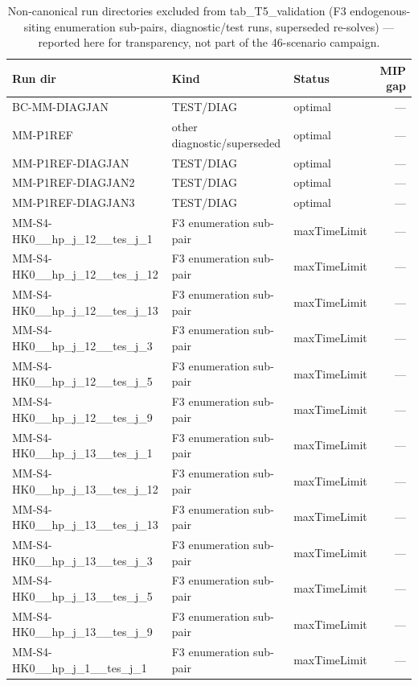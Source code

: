 \begin{table}[htbp]
  \centering
  \caption{Non-canonical run directories excluded from tab\_T5\_validation (F3 endogenous-siting enumeration sub-pairs, diagnostic/test runs, superseded re-solves) — reported here for transparency, not part of the 46-scenario campaign.}
  \label{tab:t5_supplement_excluded}
  \begin{tabular}{lllr}
  \toprule
  Run dir & Kind & Status & MIP gap \\
  \midrule
  BC-MM-DIAGJAN & TEST/DIAG & optimal & — \\
  MM-P1REF & other diagnostic/superseded & optimal & — \\
  MM-P1REF-DIAGJAN & TEST/DIAG & optimal & — \\
  MM-P1REF-DIAGJAN2 & TEST/DIAG & optimal & — \\
  MM-P1REF-DIAGJAN3 & TEST/DIAG & optimal & — \\
  MM-S4-HK0\_\_hp\_j\_12\_\_tes\_j\_1 & F3 enumeration sub-pair & maxTimeLimit & — \\
  MM-S4-HK0\_\_hp\_j\_12\_\_tes\_j\_12 & F3 enumeration sub-pair & maxTimeLimit & — \\
  MM-S4-HK0\_\_hp\_j\_12\_\_tes\_j\_13 & F3 enumeration sub-pair & maxTimeLimit & — \\
  MM-S4-HK0\_\_hp\_j\_12\_\_tes\_j\_3 & F3 enumeration sub-pair & maxTimeLimit & — \\
  MM-S4-HK0\_\_hp\_j\_12\_\_tes\_j\_5 & F3 enumeration sub-pair & maxTimeLimit & — \\
  MM-S4-HK0\_\_hp\_j\_12\_\_tes\_j\_9 & F3 enumeration sub-pair & maxTimeLimit & — \\
  MM-S4-HK0\_\_hp\_j\_13\_\_tes\_j\_1 & F3 enumeration sub-pair & maxTimeLimit & — \\
  MM-S4-HK0\_\_hp\_j\_13\_\_tes\_j\_12 & F3 enumeration sub-pair & maxTimeLimit & — \\
  MM-S4-HK0\_\_hp\_j\_13\_\_tes\_j\_13 & F3 enumeration sub-pair & maxTimeLimit & — \\
  MM-S4-HK0\_\_hp\_j\_13\_\_tes\_j\_3 & F3 enumeration sub-pair & maxTimeLimit & — \\
  MM-S4-HK0\_\_hp\_j\_13\_\_tes\_j\_5 & F3 enumeration sub-pair & maxTimeLimit & — \\
  MM-S4-HK0\_\_hp\_j\_13\_\_tes\_j\_9 & F3 enumeration sub-pair & maxTimeLimit & — \\
  MM-S4-HK0\_\_hp\_j\_1\_\_tes\_j\_1 & F3 enumeration sub-pair & maxTimeLimit & — \\

\end{tabular}
\end{table}
